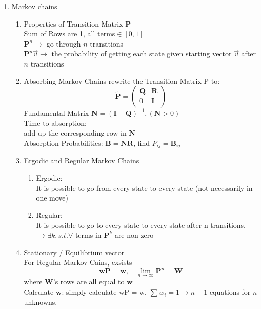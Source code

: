 \documentclass[10pt]{article}
\newcommand{\Ib}{\mathbf{I}}
\newcommand{\Pb}{\mathbf{P}}
\newcommand{\Qb}{\mathbf{Q}}
\newcommand{\Rb}{\mathbf{R}}
\newcommand{\Nb}{\mathbf{N}}
\begin{document}
\begin{multicols}{2}
\begin{enumerate}
\item Markov chains
	\begin{enumerate}
%
	\item Properties of Transition Matrix $\Pb$\\
		Sum of Rows are 1, all terms$\in [0,1]$\\
		$\Pb^n\rightarrow$ go through $n$ transitions\\
		$\Pb^n \vec v\rightarrow$ the probability of getting each state given starting vector $\vec v$ after $n$ transitions
%
	\item Absorbing Markov Chains
	rewrite the Transition Matrix P to:
	$$\tilde{\Pb} = \left(
	\begin{array}{cc}
	\Qb & \Rb  \\
	0 & \Ib  \\
	\end{array} \right)$$
	Fundamental Matrix $\Nb= (\Ib - \Qb)^{-1},(\Nb > 0)$\\
	Time to absorption: \\
	add up the corresponding row in $\Nb$\\
	Absorption Probabilities: $\mathbf{B} = \Nb \Rb$, find $P_{ij} = \mathbf{B}_{ij}$
%
	\item Ergodic and Regular Markov Chains
	\begin{enumerate}
		\item Ergodic:\\
		It is possible to go from every state to every state (not necessarily in one move)
		\item Regular:\\
	It is possible to go to every state to every state after n transitions.$\rightarrow \exists k, s.t. \forall$ terms in $\Pb^k$ are non-zero
		\end{enumerate}
	\item Stationary / Equilibrium vector\\
	For Regular Markov Cains, exsists $$\mathbf{w}\Pb = \mathbf{w}, \ \ \ \  \lim_{n\rightarrow \infty} \Pb^n = \mathbf{W}$$ where $\mathbf{W}$'s rows are all equal to $\mathbf{w}$\\
	Calculate $\mathbf{w}$:
	simply calculate wP = w, $\sum w_i = 1\rightarrow n+1$ equations for $n$ unknowns.

\end{enumerate}
\end{enumerate}
\end{multicols}
\end{document}
